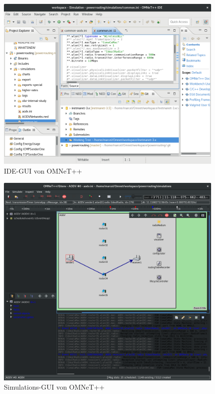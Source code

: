 \begin{figure}
  \centering
  \includegraphics[scale=0.33]{bilder/gui1.png}
  \caption{IDE-GUI von OMNeT++}
  \label{image:omnet:gui}
\end{figure}

\begin{figure}
  \centering
  \includegraphics[scale=0.3]{bilder/gui2.png}
  \caption{Simulations-GUI von OMNeT++}
  \label{image:omnet:rungui}
\end{figure}

